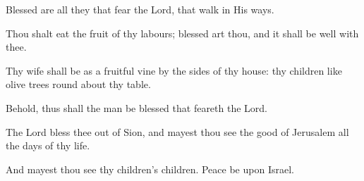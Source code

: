 Blessed are all they that fear the Lord, that walk in His ways.

Thou shalt eat the fruit of thy labours; blessed art thou, and it shall be well with thee.

Thy wife shall be as a fruitful vine by the sides of thy house: thy children like olive trees round about thy table.

Behold, thus shall the man be blessed that feareth the Lord.

The Lord bless thee out of Sion, and mayest thou see the good of Jerusalem all the days of thy life.

And mayest thou see thy children's children. Peace be upon Israel.
